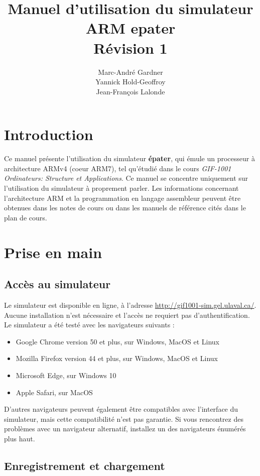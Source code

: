 \documentclass{tufte-handout}
\title{Manuel d'utilisation du simulateur ARM epater\\Révision 1}
\author{Marc-André Gardner\\Yannick Hold-Geoffroy\\Jean-François Lalonde}
\begin{document}
\maketitle%


\section{Introduction}

Ce manuel présente l'utilisation du simulateur \textbf{épater}, qui émule un processeur à architecture ARMv4 (coeur ARM7), tel qu'étudié dans le cours \textit{GIF-1001 Ordinateurs: Structure et Applications}. Ce manuel se concentre uniquement sur l'utilisation du simulateur à proprement parler. Les informations concernant l'architecture ARM et la programmation en langage assembleur peuvent être obtenues dans les notes de cours ou dans les manuels de référence cités dans le plan de cours.

\section{Prise en main}

\subsection{Accès au simulateur}

Le simulateur est disponible en ligne, à l'adresse \url{http://gif1001-sim.gel.ulaval.ca/}. Aucune installation n'est nécessaire et l'accès ne requiert pas d'authentification. Le simulateur a été testé avec les navigateurs suivants :
\begin{itemize}
	\item Google Chrome version 50 et plus, sur Windows, MacOS et Linux
	\item Mozilla Firefox version 44 et plus, sur Windows, MacOS et Linux
	\item Microsoft Edge, sur Windows 10
	\item Apple Safari, sur MacOS
\end{itemize}

D'autres navigateurs peuvent également être compatibles avec l'interface du simulateur, mais cette compatibilité n'est pas garantie. Si vous rencontrez des problèmes avec un navigateur alternatif, installez un des navigateurs énumérés plus haut.

\subsection{Enregistrement et chargement}
\end{document}
